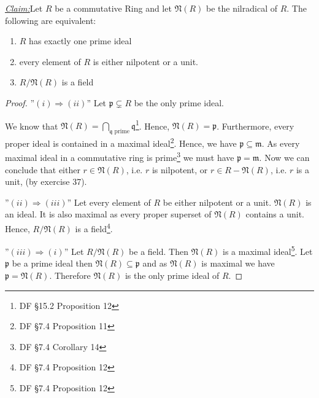 \documentclass{article}
\newcommand{\m}{\mathfrak{m}}
\newcommand{\p}{\mathfrak{p}}
\newcommand{\nr}{\mathfrak{N}}
\newcommand{\claim}
{\underline{\textit{Claim:}}\hspace{0,2cm}}
\theoremstyle{definition}
\theoremstyle{plain}
\theoremstyle{remark}
\begin{document}
\claim Let $R$ be a commutative Ring and let $\nr(R)$ be the nilradical of $R$. The following are equivalent:
\begin{enumerate}
	\item $R$ has exactly one prime ideal
	\item every element of $R$ is either nilpotent or a unit.
	\item $R/\nr(R)$ is a field
\end{enumerate}
\begin{proof}
	''$(i) \Longrightarrow (ii)$'' Let $\p\subsetneq R$ be the only prime ideal. 

	We know that $\nr(R) = \bigcap_{\mathfrak{q}\text{ prime}}\mathfrak{q}$\footnote{DF §15.2 Proposition 12}. Hence, $\nr(R)=\p$. Furthermore, every proper ideal is contained in a maximal ideal\footnote{DF §7.4 Proposition 11}. Hence, we have $\p \subseteq \m$. As every maximal ideal in a commutative ring is prime\footnote{DF §7.4 Corollary 14} we must have $\p = \m$.
	Now we can conclude that either $r \in \nr(R)$, i.e. $r$ is nilpotent, or $r\in R - \nr(R)$, i.e. $r$ is a unit, (by exercise 37).

	''$(ii)\Longrightarrow (iii)$'' Let every element of $R$ be either nilpotent or a unit. $\nr(R)$ is an ideal. It is also maximal as every proper superset of $\nr(R)$ contains a unit. Hence, $R/\nr(R)$ is a field\footnote{DF §7.4 Proposition 12}.

	''$(iii)\Longrightarrow (i)$'' Let $R/\nr(R)$ be a field. Then $\nr(R)$ is a maximal ideal\footnote{DF §7.4 Proposition 12}. Let $\p$ be a prime ideal then $\nr(R)\subseteq \p$ and as $\nr(R)$ is maximal we have $\p=\nr(R)$. 
	Therefore $\nr(R)$ is the only prime ideal of $R$.
\end{proof}
\end{document}
